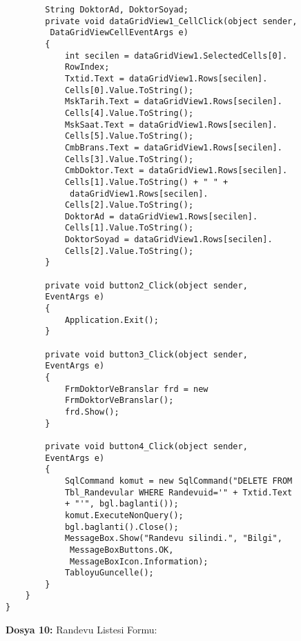 \begin{lstlisting}
        String DoktorAd, DoktorSoyad;
        private void dataGridView1_CellClick(object sender,
         DataGridViewCellEventArgs e)
        {
            int secilen = dataGridView1.SelectedCells[0].
            RowIndex;
            Txtid.Text = dataGridView1.Rows[secilen].
            Cells[0].Value.ToString();
            MskTarih.Text = dataGridView1.Rows[secilen].
            Cells[4].Value.ToString();
            MskSaat.Text = dataGridView1.Rows[secilen].
            Cells[5].Value.ToString();
            CmbBrans.Text = dataGridView1.Rows[secilen].
            Cells[3].Value.ToString();
            CmbDoktor.Text = dataGridView1.Rows[secilen].
            Cells[1].Value.ToString() + " " +
             dataGridView1.Rows[secilen].
            Cells[2].Value.ToString();
            DoktorAd = dataGridView1.Rows[secilen].
            Cells[1].Value.ToString();
            DoktorSoyad = dataGridView1.Rows[secilen].
            Cells[2].Value.ToString();
        }

        private void button2_Click(object sender, 
        EventArgs e)
        {
            Application.Exit();
        }

        private void button3_Click(object sender, 
        EventArgs e)
        {
            FrmDoktorVeBranslar frd = new 
            FrmDoktorVeBranslar();
            frd.Show();
        }

        private void button4_Click(object sender, 
        EventArgs e)
        {
            SqlCommand komut = new SqlCommand("DELETE FROM 
            Tbl_Randevular WHERE Randevuid='" + Txtid.Text 
            + "'", bgl.baglanti());
            komut.ExecuteNonQuery();
            bgl.baglanti().Close();
            MessageBox.Show("Randevu silindi.", "Bilgi",
             MessageBoxButtons.OK, 
             MessageBoxIcon.Information);
            TabloyuGuncelle();
        }
    }
}
\end{lstlisting}

\textbf{Dosya 10:} Randevu Listesi Formu:

